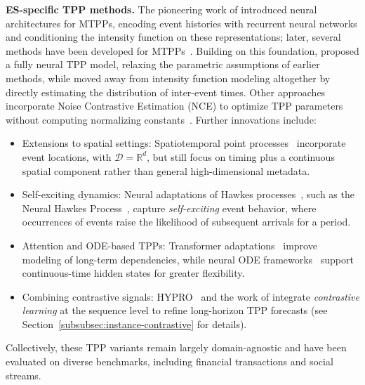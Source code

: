 \documentclass[twoside,11pt]{article}
\begin{document}
{\bf ES-specific TPP methods.}
The pioneering work of  introduced neural architectures for MTPPs, encoding event histories with recurrent neural networks and conditioning the intensity function on these representations; later, several methods have been developed for MTPPs~. Building on this foundation,  proposed a fully neural TPP model, relaxing the parametric assumptions of earlier methods, while  moved away from intensity function modeling altogether by directly estimating the distribution of inter-event times. Other approaches incorporate Noise Contrastive Estimation (NCE) to optimize TPP parameters without computing normalizing constants~. Further innovations include:
\begin{itemize}
\item Extensions to spatial settings: Spatiotemporal point processes~ incorporate event locations, with $\mathcal{D} = \mathbb{R}^d$, but still focus on timing plus a continuous spatial component rather than general high-dimensional metadata.

\item Self-exciting dynamics: Neural adaptations of Hawkes processes~, such as the Neural Hawkes Process~, capture {\it self-exciting} event behavior, where occurrences of events raise the likelihood of subsequent arrivals for a period.

\item Attention and ODE-based TPPs: Transformer adaptations~ improve modeling of long-term dependencies, while neural ODE frameworks~ support continuous-time hidden states for greater flexibility.

\item Combining contrastive signals: HYPRO~ and the work of  integrate {\it contrastive learning} at the sequence level to refine long-horizon TPP forecasts (see Section~\ref{subsubsec:instance-contrastive} for details).
\end{itemize}
Collectively, these TPP variants remain largely domain-agnostic and have been evaluated on diverse benchmarks, including financial transactions and social streams.
\end{document}
